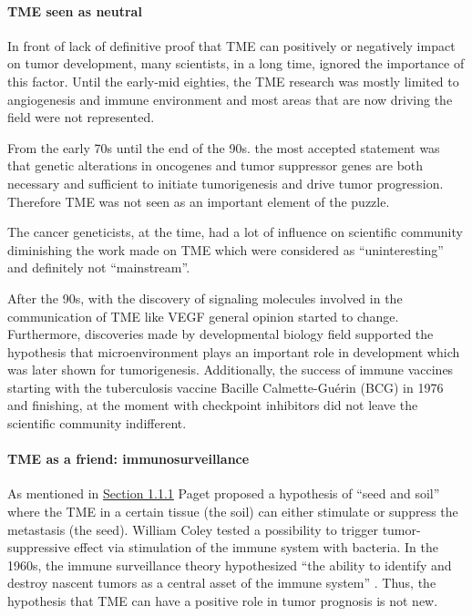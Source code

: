 \documentclass[12pt,]{book}
\let\oldparagraph\paragraph
\renewcommand{\paragraph}[1]{\oldparagraph{#1}\mbox{}}
\theoremstyle{definition}
\theoremstyle{definition}
\theoremstyle{definition}
\theoremstyle{remark}
\begin{document}
\hypertarget{tme-seen-as-neutral}{%
\paragraph{TME seen as neutral}\label{tme-seen-as-neutral}}

In front of lack of definitive proof that TME can positively or
negatively impact on tumor development, many scientists, in a long time,
ignored the importance of this factor. Until the early-mid eighties, the
TME research was mostly limited to angiogenesis and immune environment
and most areas that are now driving the field were not represented.

From the early 70s until the end of the 90s. the most accepted statement
was that genetic alterations in oncogenes and tumor suppressor genes are
both necessary and sufficient to initiate tumorigenesis and drive tumor
progression. Therefore TME was not seen as an important element of the
puzzle.

The cancer geneticists, at the time, had a lot of influence on
scientific community diminishing the work made on TME which were
considered as ``uninteresting'' and definitely not ``mainstream''.

After the 90s, with the discovery of signaling molecules involved in the
communication of TME like VEGF general opinion started to change.
Furthermore, discoveries made by developmental biology field supported
the hypothesis that microenvironment plays an important role in
development which was later shown for tumorigenesis. Additionally, the
success of immune vaccines starting with the tuberculosis vaccine
Bacille Calmette-Guérin (BCG) in 1976 and finishing, at the moment with
checkpoint inhibitors did not leave the scientific community
indifferent.

\hypertarget{tme-as-a-friend-immunosurveillance}{%
\paragraph{TME as a friend:
immunosurveillance}\label{tme-as-a-friend-immunosurveillance}}

As mentioned in \protect\hyperlink{hist}{Section 1.1.1} Paget proposed a
hypothesis of ``seed and soil'' where the TME in a certain tissue (the
soil) can either stimulate or suppress the metastasis (the seed).
William Coley tested a possibility to trigger tumor-suppressive effect
via stimulation of the immune system with bacteria. In the 1960s, the
immune surveillance theory hypothesized ``the ability to identify and
destroy nascent tumors as a central asset of the immune system''
\citep{Sebeok1976, Burnet1970}. Thus, the hypothesis that TME can have a
positive role in tumor prognosis is not new.
\end{document}
